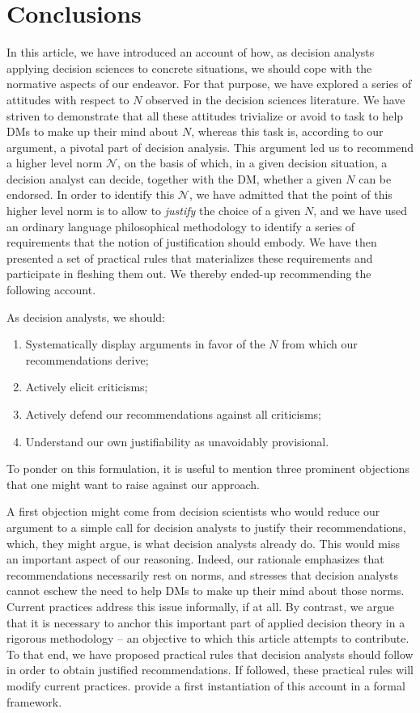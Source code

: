 \documentclass[preprint, french, english, 11pt, authoryear]{elsarticle}%
\newcommand{\adv}{\mathscr{N}}
\begin{document}
\section{Conclusions}
\label{sec:concl}
In this article, we have introduced an account of how, as decision analysts applying decision sciences to concrete situations, we should cope with the normative aspects of our endeavor. For that purpose, we have explored a series of attitudes with respect to $N$ observed in the decision sciences literature. We have striven to demonstrate that all these attitudes trivialize or avoid to task to help \acp{DM} to make up their mind about $N$, whereas this task is, according to our argument, a pivotal part of decision analysis. This argument led us to recommend a higher level norm $\adv$, on the basis of which, in a given decision situation, a decision analyst can decide, together with the \ac{DM}, whether a given $N$ can be endorsed. In order to identify this $\adv$, we have admitted that the point of this higher level norm is to allow to \emph{justify} the choice of a given $N$, and we have used an ordinary language philosophical methodology to identify a series of requirements that the notion of justification should embody. We have then presented a set of practical rules that materializes these requirements and participate in fleshing them out. We thereby ended-up recommending the following account.

As decision analysts, we should:
\begin{enumerate}[label=\roman*.]
	\item Systematically display arguments in favor of the $N$ from which our recommendations derive;
	\item Actively elicit criticisms;
	\item Actively defend our recommendations against all criticisms;
	\item Understand our own justifiability as unavoidably provisional.
\end{enumerate}

To ponder on this formulation, it is useful to mention three prominent objections that one might want to raise against our approach.

A first objection might come from decision scientists who would reduce our argument to a simple call for decision analysts to justify their recommendations, which, they might argue, is what decision analysts already do. This would miss an important aspect of our reasoning. Indeed, our rationale emphasizes that recommendations necessarily rest on norms, and stresses that decision analysts cannot eschew the need to help \acp{DM} to make up their mind about those norms. Current practices address this issue informally, if at all. By contrast, we argue that it is necessary to anchor this important part of applied decision theory in a rigorous methodology -- an objective to which this article attempts to contribute. To that end, we have proposed practical rules that decision analysts should follow in order to obtain justified recommendations. If followed, these practical rules will modify current practices. \citet{cailloux_formal_2018} provide a first instantiation of this account in a formal framework.
\end{document}

